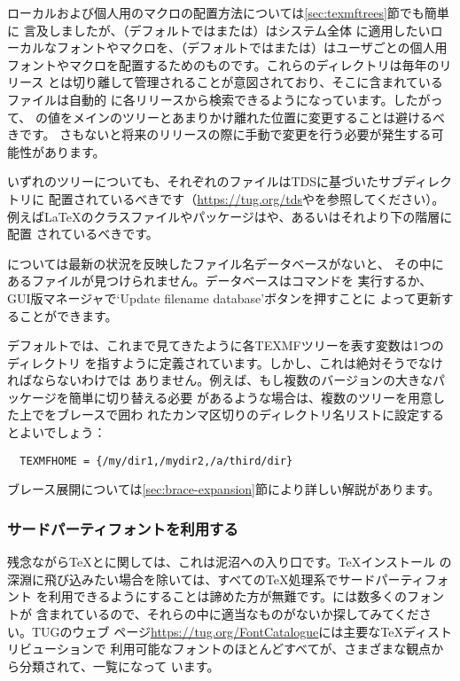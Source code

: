 \documentclass[uplatex,dvipdfmx,12pt,tombow]{jsarticle}
\begin{document}
ローカルおよび個人用のマクロの配置方法については\ref{sec:texmftrees}節でも簡単に
言及しましたが、（デフォルトではまたは）はシステム全体
に適用したいローカルなフォントやマクロを、（デフォルトではまたは）はユーザごとの個人用
フォントやマクロを配置するためのものです。これらのディレクトリは毎年のリリース
とは切り離して管理されることが意図されており、そこに含まれているファイルは自動的
に各\TL リリースから検索できるようになっています。したがって、%
の値をメインの\TL ツリーとあまりかけ離れた位置に変更することは避けるべきです。
さもないと将来のリリースの際に手動で変更を行う必要が発生する可能性があります。

いずれのツリーについても、それぞれのファイルはTDSに基づいたサブディレクトリに
配置されているべきです（\url{https://tug.org/tds}やを参照してください）。例えば\LaTeX のクラスファイルやパッケージはや、あるいはそれより下の階層に配置
されているべきです。

については最新の状況を反映したファイル名データベースがないと、
その中にあるファイルが見つけられません。データベースはコマンドを
実行するか、GUI版\TL マネージャで`Update filename database'ボタンを押すことに
よって更新することができます。

デフォルトでは、これまで見てきたように各TEXMFツリーを表す変数は1つのディレクトリ
を指すように定義されています。しかし、これは絶対そうでなければならないわけでは
ありません。例えば、もし複数のバージョンの大きなパッケージを簡単に切り替える必要
があるような場合は、複数のツリーを用意した上でをブレースで囲わ
れたカンマ区切りのディレクトリ名リストに設定するとよいでしょう：
%
\begin{verbatim}
  TEXMFHOME = {/my/dir1,/mydir2,/a/third/dir}
\end{verbatim}
%
ブレース展開については\ref{sec:brace-expansion}節により詳しい解説があります。

\subsubsection{サードパーティフォントを利用する}

残念ながら\TeX と\pdfTeX に関しては、これは泥沼への入り口です。\TeX インストール
の深淵に飛び込みたい場合を除いては、すべての\TeX 処理系でサードパーティフォント
を利用できるようにすることは諦めた方が無難です。\TL には数多くのフォントが
含まれているので、それらの中に適当なものがないか探してみてください。TUGのウェブ
ページ\url{https://tug.org/FontCatalogue}には主要な\TeX ディストリビューションで
利用可能なフォントのほとんどすべてが、さまざまな観点から分類されて、一覧になって
います。
\end{document}
